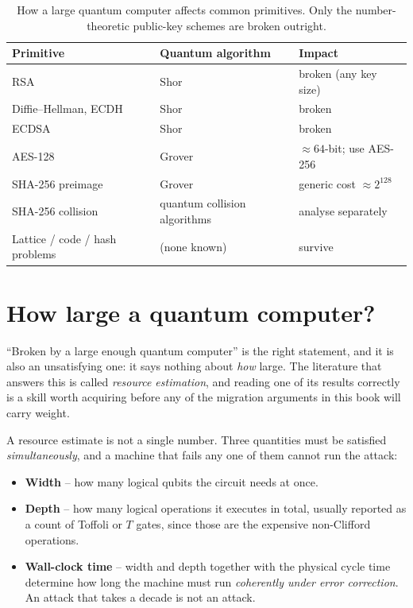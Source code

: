\begin{table}[H]
\centering
\begin{tabular}{lll}
\toprule
Primitive & Quantum algorithm & Impact \\
\midrule
RSA & Shor & broken (any key size) \\
Diffie--Hellman, ECDH & Shor & broken \\
ECDSA & Shor & broken \\
AES-128 & Grover & $\approx 64$-bit; use AES-256 \\
SHA-256 preimage & Grover & generic cost $\approx 2^{128}$ \\
SHA-256 collision & quantum collision algorithms & analyse separately \\
Lattice / code / hash problems & (none known) & survive \\
\bottomrule
\end{tabular}
\caption{How a large quantum computer affects common primitives. Only the number-theoretic public-key schemes are broken outright.}
\end{table}

\section{How large a quantum computer?}
\label{sec:resource-estimates}

``Broken by a large enough quantum computer'' is the right statement, and it is
also an unsatisfying one: it says nothing about \emph{how} large. The literature
that answers this is called \emph{resource estimation}, and reading one of its
results correctly is a skill worth acquiring before any of the migration
arguments in this book will carry weight.

A resource estimate is not a single number. Three quantities must be satisfied
\emph{simultaneously}, and a machine that fails any one of them cannot run the
attack:

\begin{itemize}
  \item \textbf{Width} -- how many logical qubits the circuit needs at once.
  \item \textbf{Depth} -- how many logical operations it executes in total,
        usually reported as a count of Toffoli or $T$ gates, since those are the
        expensive non-Clifford operations.
  \item \textbf{Wall-clock time} -- width and depth together with the physical
        cycle time determine how long the machine must run \emph{coherently
        under error correction}. An attack that takes a decade is not an attack.
\end{itemize}

